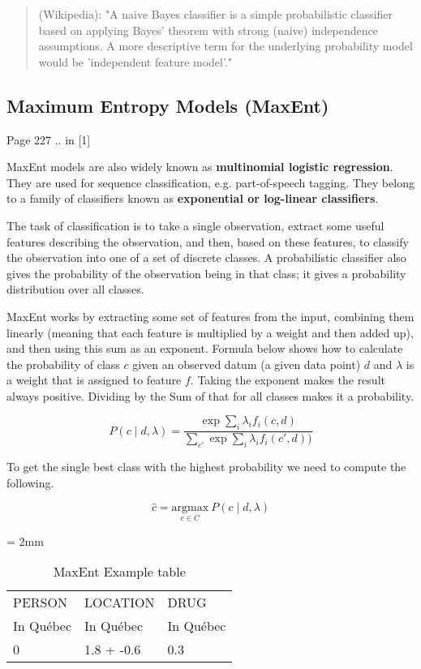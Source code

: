 \begin{quote}
  (Wikipedia): "A naive Bayes classifier is a simple probabilistic classifier based on applying Bayes' theorem with strong (naive) independence assumptions. A more descriptive term for the underlying probability model would be 'independent feature model'."
\end{quote}

\subsection*{Maximum Entropy Models (MaxEnt)}

Page 227 .. in [1]

MaxEnt models are also widely known as \textbf{multinomial logistic regression}. They are used for sequence classification, e.g. part-of-speech tagging. They belong to a family of classifiers known as \textbf{exponential or log-linear classifiers}.

The task of classification is to take a single observation, extract some useful features describing the observation, and then, based on these features, to classify the observation into one of a set of discrete classes. A probabilistic classifier also gives the probability of the observation being in that class; it gives a probability distribution over all classes.

MaxEnt works by extracting some set of features from the input, combining them linearly (meaning that each feature is multiplied by a weight and then added up), and then using this sum as an exponent.
Formula below shows how to calculate the probability of class $c$ given an observed datum (a given data point) $d$ and $\lambda$ is a weight that is assigned to feature $f$. Taking the exponent makes the result always positive. Dividing by the Sum of that for all classes makes it a probability.

\begin{equation}
  P(c \mid d, \lambda) = \frac{\exp\sum_i\lambda_i f_i (c,d)}{\sum_{c\prime}\exp\sum_{i}\lambda_i f_i (c\prime,d))}
\end{equation}

To get the single best class with the highest probability we need to compute the following.

\begin{equation}
  \hat{c} = \underset{c\in C}{\text{argmax}} \ P(c \mid d,\lambda)
\end{equation}

\begin{table}[!htbp]
  \centering
  \everyrow{\hrule}
  \tabulinesep = 2mm
  \begin{tabu}{|X|X|X|}
  PERSON    & LOCATION   & DRUG      \\
  In Québec & In Québec  & In Québec \\
  0         & 1.8 + -0.6 & 0.3       \\
  \end{tabu}
\caption[MaxEnt Example table]{MaxEnt Example table}
\label{tab:maxent}
\end{table}

